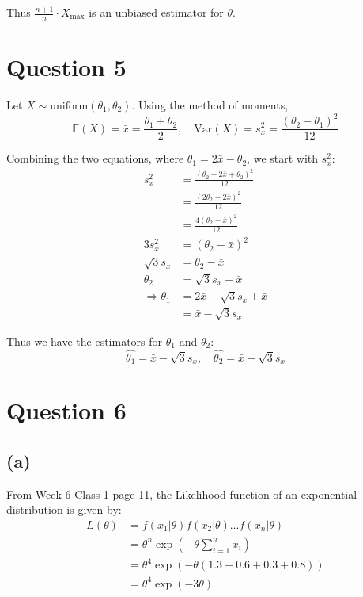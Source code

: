 \documentclass[12pt]{article}
\begin{document}
Thus $ \displaystyle\frac{n+1}{n} \cdot X_\text{max}$ is an unbiased estimator for $\theta$. 

\newpage

\section*{Question 5}

Let $X \sim \text{uniform}(\theta_1, \theta_2)$. Using the method of moments, \begin{equation*}
    \mathbb{E}(X) = \bar{x} = \frac{\theta_{1}+\theta_2}{2}, \quad \text{Var}(X) = s_x^{2} = \frac{(\theta_2 - \theta_1)^{2}}{12}
\end{equation*}

Combining the two equations, where $\theta_1 = 2 \bar{x} - \theta_2$, we start with $s_x^{2}$: \begin{align*}
    s_x^{2} &= \frac{(\theta_2 - 2\bar{x}+\theta_2)^{2}}{12} \\ 
    &= \frac{(2\theta_2 - 2\bar{x})^{2}}{12} \\ 
    &= \frac{4(\theta_2 - \bar{x})^{2}}{12} \\ 
    3 s_x^{2} &= (\theta_2 - \bar{x})^{2} \\ 
    \sqrt{3}s_x &= \theta_2 - \bar{x} \\ 
    \theta_2 &= \sqrt{3}s_x + \bar{x} \\ 
    \Rightarrow \theta_1 &= 2 \bar{x} - \sqrt{3}s_x + \bar{x} \\ 
    &= \bar{x} - \sqrt{3}s_x
\end{align*}

\noindent Thus we have the estimators for $\theta_1$ and $\theta_2$: \begin{equation*}
    \boxed{\hat{\theta_1} = \bar{x}- \sqrt{3}s_x, \quad \hat{\theta_2} = \bar{x} + \sqrt{3}s_x}
\end{equation*}

\newpage

\section*{Question 6}

\subsection*{(a)}

From Week 6 Class 1 page 11, the Likelihood function of an exponential distribution is given by: \begin{align*}
    L(\theta) &= f(x_{1}|\theta)f(x_{2}|\theta)\dots f(x_n|\theta) \\ 
    &= \theta^{n} \exp \left( -\theta \sum_{i=1}^{n} x_i \right) \\ 
    &= \theta^{4} \exp \left( -\theta (1.3 + 0.6 + 0.3 + 0.8) \right) \\ 
    &= \theta^{4} \exp \left( -3 \theta  \right)
\end{align*}
\end{document}
